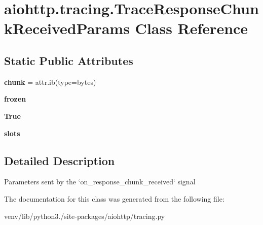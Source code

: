 \hypertarget{classaiohttp_1_1tracing_1_1_trace_response_chunk_received_params}{}\section{aiohttp.\+tracing.\+Trace\+Response\+Chunk\+Received\+Params Class Reference}
\label{classaiohttp_1_1tracing_1_1_trace_response_chunk_received_params}
\subsection*{Static Public Attributes}
\begin{DoxyCompactItemize}
\item 
\mbox{\label{classaiohttp_1_1tracing_1_1_trace_response_chunk_received_params_a11992f8db7b1fee91b42055207394ecd}} 
{\bfseries chunk} = attr.\+ib(type=bytes)
\item 
\mbox{\label{classaiohttp_1_1tracing_1_1_trace_response_chunk_received_params_a52cc83eb0c6b280859dd4dc2fa9e7db2}} 
{\bfseries frozen}
\item 
\mbox{\label{classaiohttp_1_1tracing_1_1_trace_response_chunk_received_params_a9f2a6ccd2a37d446c3784c8cdd8344e0}} 
{\bfseries True}
\item 
\mbox{\label{classaiohttp_1_1tracing_1_1_trace_response_chunk_received_params_ac15bd6e72feb2921f37849847606ec44}} 
{\bfseries slots}
\end{DoxyCompactItemize}


\subsection{Detailed Description}
\begin{DoxyVerb}Parameters sent by the `on_response_chunk_received` signal\end{DoxyVerb}
 

The documentation for this class was generated from the following file\+:\begin{DoxyCompactItemize}
\item 
venv/lib/python3./site-\/packages/aiohttp/tracing.\+py\end{DoxyCompactItemize}
